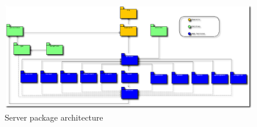\pagebreak
\begin{landscape}
  \begin{figure}
    \begin{center}
      \includegraphics[scale=0.4]{Figures/HyperPath_server_packages.eps}
     \end{center}
     \caption{Server package architecture}
    \label{Server package architecture}
  \end{figure}
\end{landscape}